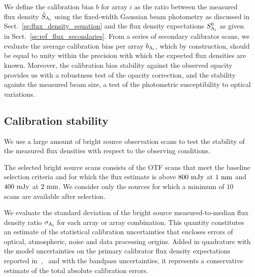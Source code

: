 We define the calibration bias $b$ for array $i$ as
the ratio between the measured flux density $\hat{S}_{\rm A_i}$ using the
fixed-width Gaussian beam photometry as discussed in
Sect.~\ref{se:flux_density_equation} and the flux density expectations $S^{0}_{\rm A_i}$ as
given in Sect.~\ref{se:ref_flux_secondaries}. From a series of
secondary calibrator scans, we evaluate the average calibration bias
per array $b_{\rm A_i}$, which by construction, should be equal to
unity within the precision with which the expected flux densities are
known. Moreover, the calibration bias stability against the observed
opacity provides us with a robustness test of the opacity correction,
and the stability againts the measured beam size, a test of the
photometric susceptibility to optical variations.

\subsection{Calibration stability}

We use a large amount of bright source observation scans to test the
stability of the measured flux densities with respect to the observing
conditions.

The selected bright source scans consists of the OTF scans that meet
the baseline selection criteria and for which the flux estimate is
above $800~\rm{mJy}$ at $1~\rm{mm}$ and $400~\rm{mJy}$ at
$2~\rm{mm}$. We consider only the sources for which a minimum of $10$
scans are available after selection.  

We evaluate the standard deviation of the bright source measured-to-median flux
density ratio $\sigma_{\rm A_i}$ for each array or array combination. 
This quantity constitutes an estimate of the statistical calibration
uncertainties that encloses errors of optical, atmospheric, noise and
data processing origins.
Added in quadrature with the model uncertainties on the primary
calibrator flux density expectations reported
in~\cite{Morenothesis},~\cite{bendo2013} and with the bandpass
uncertainties, it represents a
conservative estimate of the total absolute calibration errors.
